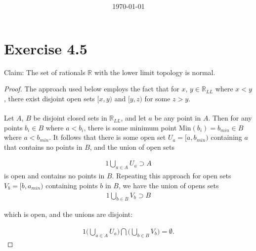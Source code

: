 \documentclass{article}
\title{ }
\date{}
\date\today
\begin{document}
\maketitle %

\thispagestyle{firstpage}
\section*{Exercise 4.5}

Claim: The set of rationals $\mathbb{R}$ with the lower limit topology is normal.

\begin{proof}
    The approach used below employs the fact that for $x$, $y \in \mathbb{R}_{LL}$ where $x < y$, there exist disjoint open 
    sets $[x, y)$ and $[y, z)$ for some $z > y$.  \\ 
    \\ 
    Let $A$, $B$ be disjoint closed sets 
    in $\mathbb{R}_{LL}$, and let $a$ be any point in $A$.  Then for any 
    points $b_i \in B$ where $a < b_i$, there is some minimum point $\mathrm{Min}(b_i) = b_{min} \in B$ 
    where $a < b_{min}$.  It follows that there 
    is some open set $U_a = [a, b_{min})$ containing $a$ that contains no points 
    in $B$, and the union of open sets 

    \begin{alignat*}{1}
        \bigcup_{a \in A} U_a \supset A
    \end{alignat*}
    is open and contains no points in $B$.  Repeating this approach for open sets 
    $V_b = [b, a_{min})$ containing points $b$ in $B$, we have the union of opens sets
    \begin{alignat*}{1}
        \bigcup_{b \in B} V_b \supset B
    \end{alignat*}

    which is open, and the unions are disjoint:

    \begin{alignat*}{1}
        \biggl(\bigcup_{a \in A} U_a \biggr) \bigcap \biggl(\bigcup_{b \in B} V_b \biggr) = \emptyset.
    \end{alignat*}
\end{proof}
\end{document}
